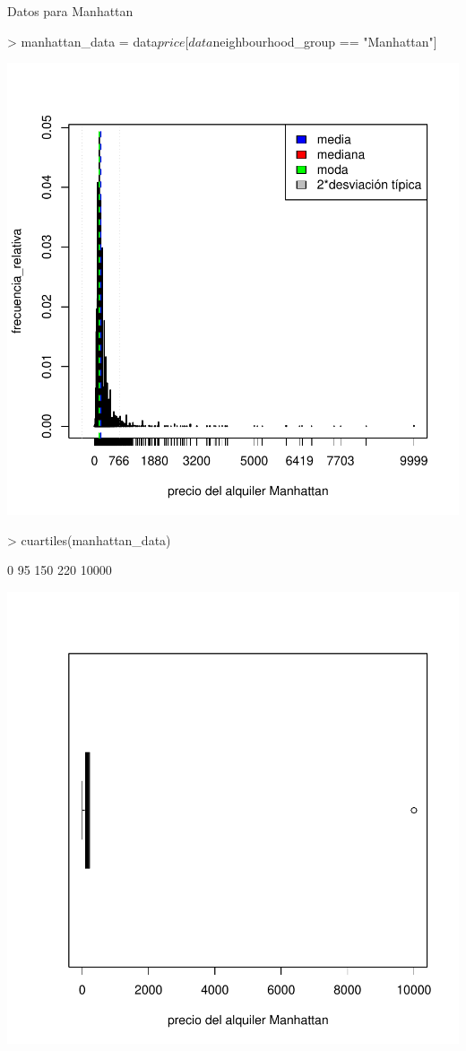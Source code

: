 \documentclass [a4paper] {article}
\begin{document}
Datos para Manhattan
\begin{Schunk}
\begin{Sinput}
> manhattan_data = data$price[data$neighbourhood_group == "Manhattan"]
\end{Sinput}
\end{Schunk}
\begin{center}
\includegraphics{entrega-manhattan_data_plot}
\begin{Schunk}
\begin{Sinput}
> cuartiles(manhattan_data)
\end{Sinput}
\begin{Soutput}
[1]     0    95   150   220 10000
\end{Soutput}
\end{Schunk}
\includegraphics{entrega-manhattan_data_plot_c}
\end{center}
\end{document}

